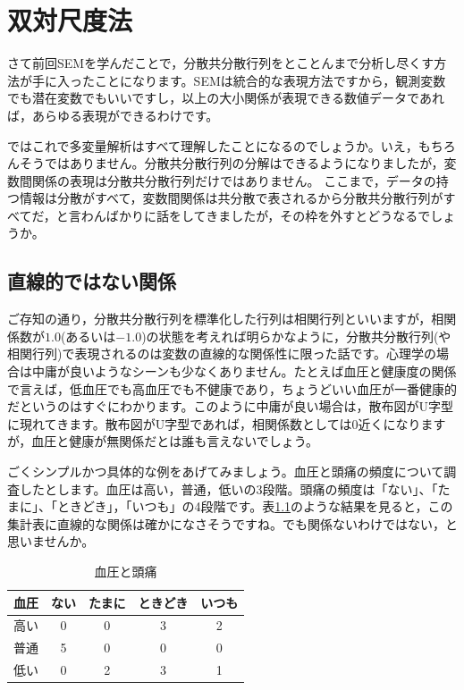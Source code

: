 \documentclass{ltjsbook}
\begin{document}
\chapter{双対尺度法}
\label{x14_DualScaling}


さて前回SEMを学んだことで，分散共分散行列をとことんまで分析し尽くす方法が手に入ったことになります。SEMは統合的な表現方法ですから，観測変数でも潜在変数でもいいですし，以上の大小関係が表現できる数値データであれば，あらゆる表現ができるわけです。

ではこれで多変量解析はすべて理解したことになるのでしょうか。いえ，もちろんそうではありません。分散共分散行列の分解はできるようになりましたが，変数間関係の表現は分散共分散行列だけではありません。
ここまで，データの持つ情報は分散がすべて，変数間関係は共分散で表されるから分散共分散行列がすべてだ，と言わんばかりに話をしてきましたが，その枠を外すとどうなるでしょうか。

\section{直線的ではない関係}

ご存知の通り，分散共分散行列を標準化した行列は相関行列といいますが，相関係数が$1.0$(あるいは$-1.0$)の状態を考えれば明らかなように，分散共分散行列(や相関行列)で表現されるのは変数の直線的な関係性に限った話です。心理学の場合は中庸が良いようなシーンも少なくありません。たとえば血圧と健康度の関係で言えば，低血圧でも高血圧でも不健康であり，ちょうどいい血圧が一番健康的だというのはすぐにわかります。このように中庸が良い場合は，散布図がU字型に現れてきます。散布図がU字型であれば，相関係数としては0近くになりますが，血圧と健康が無関係だとは誰も言えないでしょう。

ごくシンプルかつ具体的な例をあげてみましょう。血圧と頭痛の頻度について調査したとします。血圧は高い，普通，低いの3段階。頭痛の頻度は「ない」、「たまに」、「ときどき」，「いつも」の4段階です。表\ref{tbl::14_01}のような結果を見ると，この集計表に直線的な関係は確かになさそうですね。でも関係ないわけではない，と思いませんか。
\begin{table}[h]
    \begin{center}
        \caption{血圧と頭痛}
        \begin{tabular}{c|cccc}
            血圧 & ない & たまに & ときどき & いつも \\
            \hline
            高い & 0  & 0   & 3    & 2   \\
            普通 & 5  & 0   & 0    & 0   \\
            低い & 0  & 2   & 3    & 1   \\
        \end{tabular}
        \label{tbl::14_01}
    \end{center}
\end{table}
\end{document}
